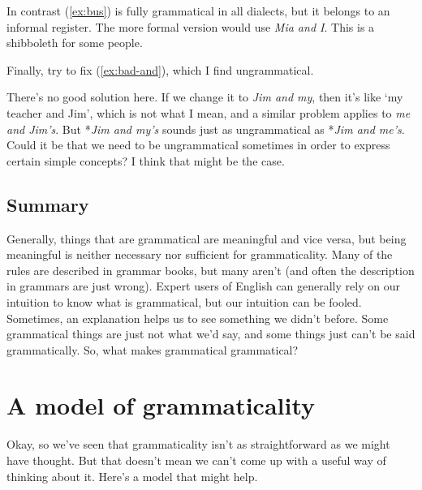 \label{ex:bus}
\z

In contrast (\ref{ex:bus}) is fully grammatical in all dialects, but it belongs to an informal register. The more formal version would use \textit{Mia and I}. This is a shibboleth for some people.

Finally, try to fix (\ref{ex:bad-and}), which I find ungrammatical.
\label{ex:bad-and}
\z

There's no good solution here. If we change it to \textit{Jim and my}, then it's like `my teacher and Jim', which is not what I mean, and a similar problem applies to \textit{me and Jim's}. But *\textit{Jim and my's} sounds just as ungrammatical as *\textit{Jim and me's}. Could it be that we need to be ungrammatical sometimes in order to express certain simple concepts? I think that might be the case.

\subsection{Summary}

Generally, things that are grammatical are meaningful and vice versa, but being meaningful is neither necessary nor sufficient for grammaticality. Many of the rules are described in grammar books, but many aren't (and often the description in grammars are just wrong). Expert users of English can generally rely on our intuition to know what is grammatical, but our intuition can be fooled. Sometimes, an explanation helps us to see something we didn't before. Some grammatical things are just not what we'd say, and some things just can't be said grammatically. So, what makes grammatical grammatical?

\section{A model of grammaticality} \label{sec:gramm-model}

Okay, so we've seen that grammaticality isn't as straightforward as we might have thought. But that doesn't mean we can't come up with a useful way of thinking about it. Here's a model that might help.

